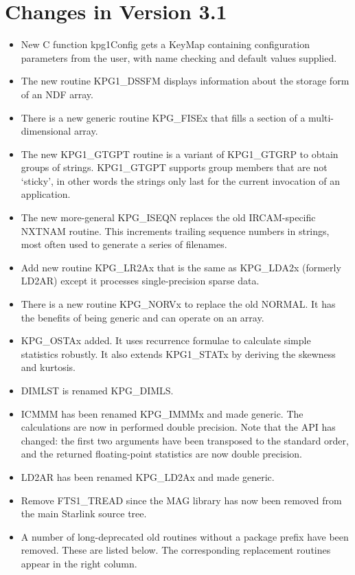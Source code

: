 \documentclass[11pt]{starlink}
\begin{document}
\section{Changes in Version 3.1}
\begin{itemize}
\item New C function kpg1Config gets a KeyMap containing configuration
      parameters from the user, with name checking and default values
      supplied.
\item The new routine KPG1\_DSSFM displays information about the storage
      form of an NDF array.
\item There is a new generic routine KPG\_FISEx that fills a section
      of a multi-dimensional array.
\item The new KPG1\_GTGPT routine is a variant of KPG1\_GTGRP to obtain
      groups of strings.  KPG1\_GTGPT supports group members that are not
      `sticky', in other words the strings only last for the current
      invocation of an application.
\item The new more-general KPG\_ISEQN replaces the old IRCAM-specific
      NXTNAM routine.  This increments trailing sequence numbers
      in strings, most often used to generate a series of filenames.
\item Add new routine KPG\_LR2Ax that is the same as KPG\_LDA2x
      (formerly LD2AR) except it processes single-precision sparse data.
\item There is a new routine KPG\_NORVx to replace the old NORMAL.  It
      has the benefits of being generic and can operate on an array.
\item KPG\_OSTAx added.  It uses recurrence formulae to calculate
      simple statistics robustly.  It also extends KPG1\_STATx by
      deriving the skewness and kurtosis.

\item DIMLST is renamed KPG\_DIMLS.
\item ICMMM has been renamed KPG\_IMMMx and made generic.  The
      calculations are now in performed double precision.  Note that
      the API has changed: the first two arguments have been transposed
      to the standard order, and the returned floating-point statistics
      are now double precision.
\item LD2AR has been renamed KPG\_LD2Ax and made generic.

\item Remove FTS1\_TREAD since the MAG library has now been removed
      from the main Starlink source tree.
\item A number of long-deprecated old routines without a package prefix
      have been removed.  These are listed below.  The corresponding
      replacement routines appear in the right column.


\end{itemize}
\end{document}
